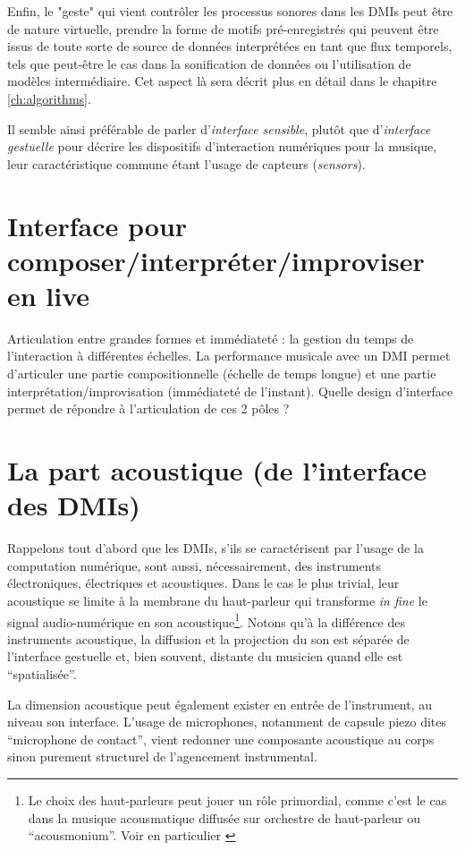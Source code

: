 Enfin, le "geste" qui vient contrôler les processus sonores dans les DMIs peut être de nature virtuelle, prendre la forme de motifs pré-enregistrés qui peuvent être issus de toute sorte de source de données interprétées en tant que flux temporels, tels que peut-être le cas dans la sonification de données ou l'utilisation de modèles intermédiaire. Cet aspect là sera décrit plus en détail dans le chapitre \ref{ch:algorithms}.

Il semble ainsi préférable de parler d'\textit{interface sensible}, plutôt que d'\textit{interface gestuelle} pour décrire les dispositifs d'interaction numériques pour la musique, leur caractéristique commune étant l'usage de capteurs (\textit{sensors}).

\section{Interface pour composer/interpréter/improviser en live}
Articulation entre grandes formes et immédiateté : la gestion du temps de l’interaction à différentes échelles.
La performance musicale avec un DMI permet d’articuler une partie compositionnelle (échelle de temps longue) et une partie interprétation/improvisation (immédiateté de l’instant). 
Quelle design d’interface permet de répondre à l’articulation de ces 2 pôles ?

\section{La part acoustique (de l'interface des \glspl{DMI})}
Rappelons tout d'abord que les \glspl{DMI}, s'ils se caractérisent par l'usage de la computation numérique, sont aussi, nécessairement, des instruments électroniques, électriques et acoustiques. 
Dans le cas le plus trivial, leur acoustique se limite à la membrane du haut-parleur qui transforme \textit{in fine} le signal audio-numérique en son acoustique\footnote{Le choix des haut-parleurs peut jouer un rôle primordial, comme c'est le cas dans la musique acousmatique diffusée sur orchestre de haut-parleur ou ``acousmonium''. Voir en particulier \cite{mooney_sound_2006}}. Notons qu'à la différence des instruments acoustique, la diffusion et la projection du son est séparée de l'interface gestuelle et, bien souvent, distante du musicien quand elle est ``spatialisée''.

La dimension acoustique peut également exister en entrée de l'instrument, au niveau son interface. L'usage de microphones, notamment de capsule piezo dites ``microphone de contact'', vient redonner une composante acoustique au corps sinon purement structurel de l'agencement instrumental.


